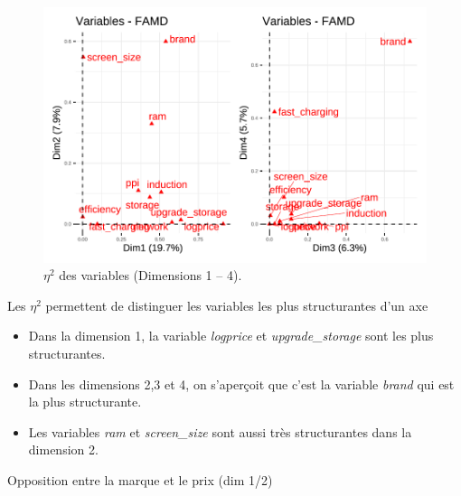 \documentclass[
  12pt,
]{report}
\begin{document}
\begin{figure}[H]

{\centering \includegraphics{report_files/figure-pdf/unnamed-chunk-12-1.pdf}

}

\caption{\(\eta^2\) des variables (Dimensions 1 -- 4).}

\end{figure}%

\newpage

Les \(\eta^2\) permettent de distinguer les variables les plus
structurantes d'un axe

\begin{itemize}
\item
  Dans la dimension 1, la variable \emph{logprice} et
  \emph{upgrade\_storage} sont les plus structurantes.
\item
  Dans les dimensions 2,3 et 4, on s'aperçoit que c'est la variable
  \emph{brand} qui est la plus structurante.
\item
  Les variables \emph{ram} et \emph{screen\_size} sont aussi très
  structurantes dans la dimension 2.
\end{itemize}

Opposition entre la marque et le prix (dim 1/2)
\end{document}
